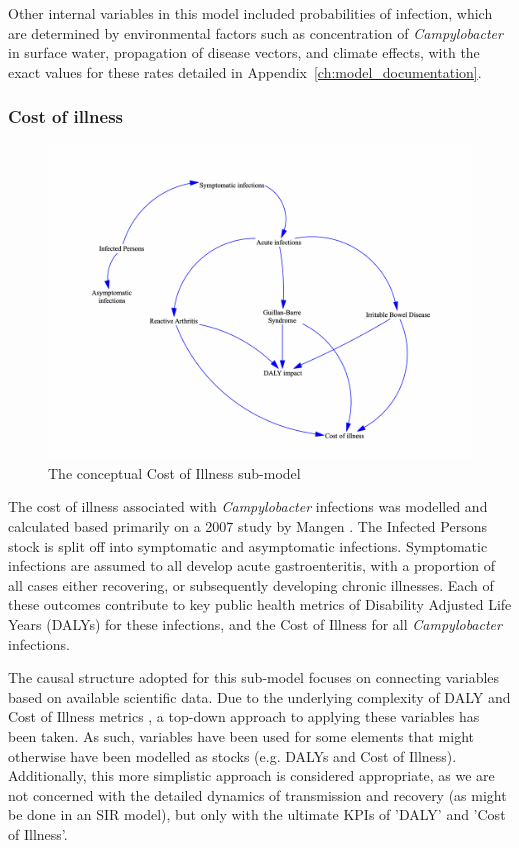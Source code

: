 Other internal variables in this model included probabilities of infection, which are determined by environmental factors such as concentration of \textit{Campylobacter} in surface water, propagation of disease vectors, and climate effects, with the exact values for these rates detailed in Appendix~\ref{ch:model_documentation}.


\subsubsection*{Cost of illness}
\begin{figure}[h]
\centering
\includegraphics[width=\textwidth]{images/COI_submodel.png}
\caption{The conceptual Cost of Illness sub-model}
\end{figure}
The cost of illness associated with \textit{Campylobacter} infections was modelled and calculated based primarily on a 2007 study by Mangen \parencite{mangen_campylobacteriosis_2007}. The Infected Persons stock is split off into symptomatic and asymptomatic infections. Symptomatic infections are assumed to all develop acute gastroenteritis, with a proportion of all cases either recovering, or subsequently developing chronic illnesses. Each of these outcomes contribute to key public health metrics of Disability Adjusted Life Years (DALYs) for these infections, and the Cost of Illness for all \textit{Campylobacter} infections. 

The causal structure adopted for this sub-model focuses on connecting variables based on available scientific data. Due to the underlying complexity of DALY and Cost of Illness metrics \parencite{jo_cost--illness_2014}, a top-down approach to applying these variables has been taken. As such, variables have been used for some elements that might otherwise have been modelled as stocks (e.g. DALYs and Cost of Illness). Additionally, this more simplistic approach is considered appropriate, as we are not concerned with the detailed dynamics of transmission and recovery (as might be done in an SIR model), but only with the ultimate KPIs of 'DALY' and 'Cost of Illness'.

